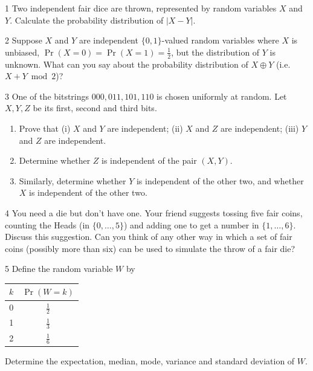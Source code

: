 
\begin{exercise}{1}
    Two independent fair dice are thrown, represented by random variables $X$
    and $Y$. Calculate the probability distribution of $|X-Y|$.
\end{exercise}

\begin{exercise}{2}
    Suppose $X$ and $Y$ are independent $\{0,1\}$-valued random variables where
    $X$ is unbiased, $\Pr(X=0)=\Pr(X=1)=\frac12$, but the distribution of $Y$ is
    unknown. What can you say about the probability distribution of
    $X\oplus Y$ (i.e.\ $X+Y\bmod2$)?
\end{exercise}

\begin{exercise}{3}
    One of the bitstrings $000,011,101,110$ is chosen uniformly at random. Let
    $X,Y,Z$ be its first, second and third bits.
    \begin{enumerate}[label=(\alph*)]
        \item Prove that (i) $X$ and $Y$ are independent; (ii) $X$ and $Z$ are
              independent; (iii) $Y$ and $Z$ are independent.
        \item Determine whether $Z$ is independent of the pair $(X,Y)$.
        \item Similarly, determine whether $Y$ is independent of the other two,
              and whether $X$ is independent of the other two.
    \end{enumerate}
\end{exercise}

\begin{exercise}{4}
    You need a die but don't have one. Your friend suggests tossing five fair
    coins, counting the Heads (in $\{0,\dots,5\}$) and adding one to get a number
    in $\{1,\dots,6\}$. Discuss this suggestion. Can you think of any other way
    in which a set of fair coins (possibly more than six) can be used to simulate
    the throw of a fair die?
\end{exercise}

\begin{exercise}{5}
    Define the random variable $W$ by
    \begin{center}
    \begin{tabular}{c|c}
        $k$ & $\Pr(W=k)$\\\hline
        0 & $\frac12$\\
        1 & $\frac13$\\
        2 & $\frac16$
    \end{tabular}
    \end{center}
    Determine the expectation, median, mode, variance and standard deviation of
    $W$.
\end{exercise}

